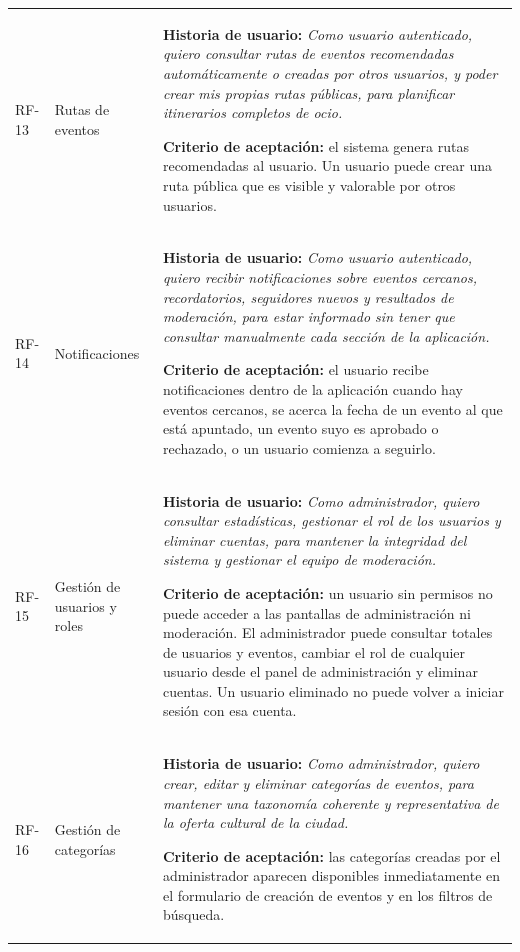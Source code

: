 {\begin{longtable}{@{}>{\raggedright\arraybackslash}p{} >{\raggedright\arraybackslash}p{} >{\raggedright\arraybackslash}p{}@{}}
\addlinespace
RF-13 & Rutas de eventos & \textbf{Historia de usuario:} \textit{Como usuario autenticado, quiero consultar rutas de eventos recomendadas automáticamente o creadas por otros usuarios, y poder crear mis propias rutas públicas, para planificar itinerarios completos de ocio.}\par\vspace{0.05cm}\textbf{Criterio de aceptación:} el sistema genera rutas recomendadas al usuario. Un usuario puede crear una ruta pública que es visible y valorable por otros usuarios. \\
\addlinespace
RF-14 & Notificaciones & \textbf{Historia de usuario:} \textit{Como usuario autenticado, quiero recibir notificaciones sobre eventos cercanos, recordatorios, seguidores nuevos y resultados de moderación, para estar informado sin tener que consultar manualmente cada sección de la aplicación.}\par\vspace{0.05cm}\textbf{Criterio de aceptación:} el usuario recibe notificaciones dentro de la aplicación cuando hay eventos cercanos, se acerca la fecha de un evento al que está apuntado, un evento suyo es aprobado o rechazado, o un usuario comienza a seguirlo. \\
\addlinespace
RF-15 & Gestión de usuarios y roles & \textbf{Historia de usuario:} \textit{Como administrador, quiero consultar estadísticas, gestionar el rol de los usuarios y eliminar cuentas, para mantener la integridad del sistema y gestionar el equipo de moderación.}\par\vspace{0.05cm}\textbf{Criterio de aceptación:} un usuario sin permisos no puede acceder a las pantallas de administración ni moderación. El administrador puede consultar totales de usuarios y eventos, cambiar el rol de cualquier usuario desde el panel de administración y eliminar cuentas. Un usuario eliminado no puede volver a iniciar sesión con esa cuenta. \\
\addlinespace
RF-16 & Gestión de categorías & \textbf{Historia de usuario:} \textit{Como administrador, quiero crear, editar y eliminar categorías de eventos, para mantener una taxonomía coherente y representativa de la oferta cultural de la ciudad.}\par\vspace{0.05cm}\textbf{Criterio de aceptación:} las categorías creadas por el administrador aparecen disponibles inmediatamente en el formulario de creación de eventos y en los filtros de búsqueda. \\

\end{longtable}}
